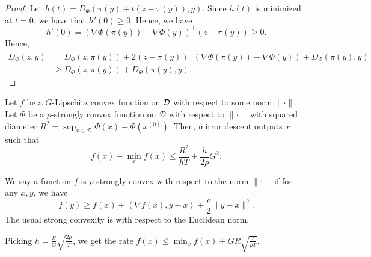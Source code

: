 \begin{proof}
Let $h(t)=D_{\Phi}(\pi(y)+t(z-\pi(y)),y)$. Since $h(t)$ is minimized
at $t=0$, we have that $h'(0)\geq0$. Hence, we have
\[
h'(0)=(\nabla\Phi(\pi(y))-\nabla\Phi(y))^{\top}(z-\pi(y))\geq0.
\]
Hence,
\begin{align*}
D_{\Phi}(z,y) & =D_{\Phi}(z,\pi(y))+2(z-\pi(y))^{\top}(\nabla\Phi(\pi(y))-\nabla\Phi(y))+D_{\Phi}(\pi(y),y)\\
 & \geq D_{\Phi}(z,\pi(y))+D_{\Phi}(\pi(y),y).
\end{align*}
\end{proof}
\begin{thm}
\label{thm:mirror_descent}Let $f$ be a $G$-Lipschitz convex function
on ${\cal D}$ with respect to some norm $\|\cdot\|$. Let $\Phi$
be a $\rho$-strongly convex function on $\mathcal{D}$ with respect
to $\|\cdot\|$ with squared diameter $R^{2}=\sup_{x\in\mathcal{D}}\Phi(x)-\Phi(x^{(0)})$.
Then, mirror descent outputs $x$ such that
\[
f(x)-\min_{x}f(x)\leq\frac{R^{2}}{hT}+\frac{h}{2\rho}G^{2}.
\]
\end{thm}

\begin{rem}
We say a function $f$ is $\rho$ strongly convex with respect to
the norm $\|\cdot\|$ if for any $x,y$, we have 
\[
f(y)\geq f(x)+\left\langle \nabla f(x),y-x\right\rangle +\frac{\rho}{2}\|y-x\|^{2}.
\]
The usual strong convexity is with respect to the Euclidean norm.
\end{rem}

\begin{rem}
Picking $h=\frac{R}{G}\sqrt{\frac{2\rho}{T}}$, we get the rate $f(x)\leq\min_{x}f(x)+GR\sqrt{\frac{2}{\rho T}}.$
\end{rem}

